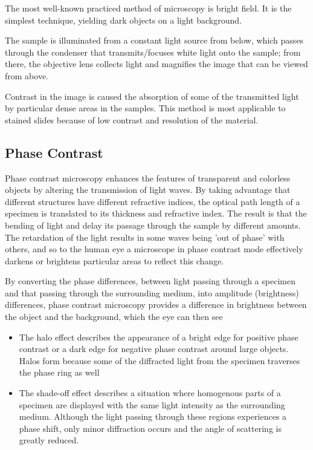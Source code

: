 \documentclass[12pt]{../SOP2}
\begin{document}
\NP The most well-known practiced method of microscopy is bright field. It is the simplest technique, yielding dark objects on a light background. 

\NP The sample is illuminated from a constant light source from below, which passes through the condenser that transmits/focuses white light onto the sample; from there, the objective lens collects light and magnifies the image that can be viewed from above. 

\NP Contrast in the image is caused the absorption of some of the transmitted light by particular dense areas in the samples. This method is most applicable to stained slides because of low contrast and resolution of the material. 

\subsection*{Phase Contrast}

\NP Phase contrast microscopy enhances the features of transparent and colorless objects by altering the transmission of light waves. 
\NP By taking advantage that different structures have different refractive indices, the optical path length of a specimen is translated to its thickness and refractive index. The result is that the bending of light and delay its passage through the sample by different amounts. The retardation of the light results in some waves being 'out of phase' with others, and so to the human eye a microscope in phase contrast mode effectively darkens or brightens particular areas to reflect this change. 

\NP By converting the phase differences, between light passing through a specimen and that passing through the surrounding medium, into amplitude (brightness) differences, phase contrast microscopy provides a difference in brightness between the object and the background, which the eye can then see

  \begin{itemize}
  \item The halo effect describes the appearance of a bright edge for positive phase contrast or a dark edge for negative phase contrast around large objects. Halos form because some of the diffracted light from the specimen traverses the phase ring as well
  \item The shade-off effect describes a situation where homogenous parts of a specimen are displayed with the same light intensity as the surrounding medium. Although the light passing through these regions experiences a phase shift, only minor diffraction occurs and the angle of scattering is greatly reduced. 
\end{itemize}
\end{document}
